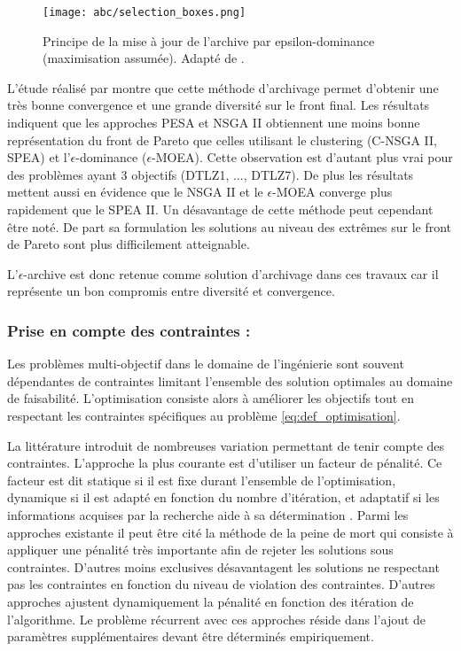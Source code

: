 \begin{figure}
    \begin{center}
        \texttt{[image: abc/selection\_boxes.png]}
    \end{center}
    \caption{Principe de la mise à jour de l’archive par epsilon-dominance (maximisation assumée).
             Adapté de \cite{Deb2005501}.
             \label{fig:epsilon_dominance}}
\end{figure}

L’étude réalisé par \cite{Deb2005501} montre que cette méthode d’archivage permet
d’obtenir une très bonne convergence et une grande diversité sur le front final. Les résultats
indiquent que les approches PESA et NSGA II obtiennent une moins bonne représentation
du front de Pareto que celles utilisant le clustering (C-NSGA II, SPEA) et l’$\epsilon$-dominance ($\epsilon$-MOEA).
Cette observation est d’autant plus vrai pour des problèmes ayant 3 objectifs (DTLZ1, ..., DTLZ7).
De plus les résultats mettent aussi en évidence que le NSGA II et le $\epsilon$-MOEA
converge plus rapidement que le SPEA II.
Un désavantage de cette méthode peut cependant être noté. De part sa formulation
les solutions au niveau des extrêmes sur le front de Pareto sont plus difficilement
atteignable.

L’$\epsilon$-archive est donc retenue comme solution d’archivage dans ces travaux
car il représente un bon compromis entre diversité et convergence.


\subsubsection{Prise en compte des contraintes :} %
\label{ssub:prise_en_compte_des_contraintes}
Les problèmes multi-objectif dans le domaine de l’ingénierie sont souvent
dépendantes de contraintes limitant l’ensemble des solution optimales au domaine
de faisabilité. L’optimisation consiste alors à améliorer les objectifs tout en
respectant les contraintes spécifiques au problème \eqref{eq:def_optimisation}.

La littérature introduit de nombreuses variation permettant de tenir compte des
contraintes. L’approche la plus courante est d’utiliser un facteur de pénalité.
Ce facteur est dit statique si il est fixe durant l’ensemble de l’optimisation, dynamique
si il est adapté en fonction du nombre d’itération, et adaptatif si les informations
acquises par la recherche aide à sa détermination \parencite{Coello2002}.
Parmi les approches existante il peut être cité la méthode de la peine de mort
qui consiste à appliquer une pénalité très importante afin de rejeter les solutions
sous contraintes. D’autres moins exclusives désavantagent les solutions ne respectant
pas les contraintes en fonction du niveau de violation des contraintes. D’autres approches
ajustent dynamiquement la pénalité en fonction des itération de l’algorithme. Le
problème récurrent avec ces approches réside dans l’ajout de paramètres supplémentaires
devant être déterminés empiriquement.

